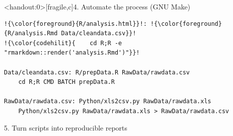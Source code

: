\documentclass[12pt,t]{beamer}
\begin{document}
\begin{frame}<handout:0>[fragile,c]{4. Automate the process (GNU Make)}

\addtocounter{framenumber}{-1}

\begin{center}
\begin{minipage}[c]{10.8cm}
\begin{semiverbatim}
\begin{lstlisting}[escapechar=!,linewidth=10.8cm]
!{\color{foreground}{R/analysis.html}}!: !{\color{foreground}{R/analysis.Rmd Data/cleandata.csv}}!
!{\color{codehilit}{    cd R;R -e "rmarkdown::render('analysis.Rmd')"}}!

Data/cleandata.csv: R/prepData.R RawData/rawdata.csv
    cd R;R CMD BATCH prepData.R

RawData/rawdata.csv: Python/xls2csv.py RawData/rawdata.xls
    Python/xls2csv.py RawData/rawdata.xls > RawData/rawdata.csv
\end{lstlisting}
\end{semiverbatim}
\end{minipage}
\end{center}
\end{frame}





\begin{frame}[c]{5. Turn scripts into reproducible reports}


\vspace*{8mm}


\end{frame}
\end{document}
